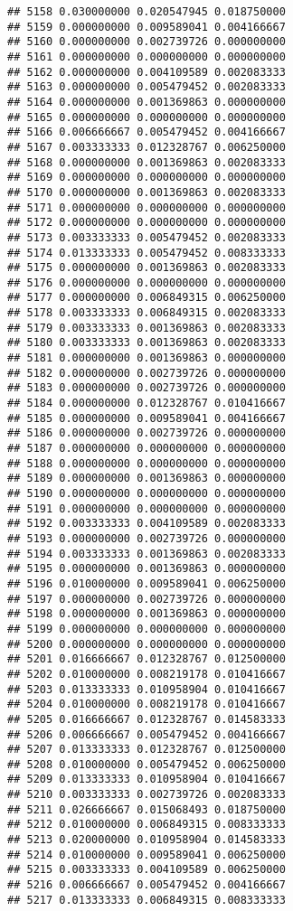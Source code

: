 \documentclass[
]{article}
\begin{document}
\begin{verbatim}
## 5158 0.030000000 0.020547945 0.018750000
## 5159 0.000000000 0.009589041 0.004166667
## 5160 0.000000000 0.002739726 0.000000000
## 5161 0.000000000 0.000000000 0.000000000
## 5162 0.000000000 0.004109589 0.002083333
## 5163 0.000000000 0.005479452 0.002083333
## 5164 0.000000000 0.001369863 0.000000000
## 5165 0.000000000 0.000000000 0.000000000
## 5166 0.006666667 0.005479452 0.004166667
## 5167 0.003333333 0.012328767 0.006250000
## 5168 0.000000000 0.001369863 0.002083333
## 5169 0.000000000 0.000000000 0.000000000
## 5170 0.000000000 0.001369863 0.002083333
## 5171 0.000000000 0.000000000 0.000000000
## 5172 0.000000000 0.000000000 0.000000000
## 5173 0.003333333 0.005479452 0.002083333
## 5174 0.013333333 0.005479452 0.008333333
## 5175 0.000000000 0.001369863 0.002083333
## 5176 0.000000000 0.000000000 0.000000000
## 5177 0.000000000 0.006849315 0.006250000
## 5178 0.003333333 0.006849315 0.002083333
## 5179 0.003333333 0.001369863 0.002083333
## 5180 0.003333333 0.001369863 0.002083333
## 5181 0.000000000 0.001369863 0.000000000
## 5182 0.000000000 0.002739726 0.000000000
## 5183 0.000000000 0.002739726 0.000000000
## 5184 0.000000000 0.012328767 0.010416667
## 5185 0.000000000 0.009589041 0.004166667
## 5186 0.000000000 0.002739726 0.000000000
## 5187 0.000000000 0.000000000 0.000000000
## 5188 0.000000000 0.000000000 0.000000000
## 5189 0.000000000 0.001369863 0.000000000
## 5190 0.000000000 0.000000000 0.000000000
## 5191 0.000000000 0.000000000 0.000000000
## 5192 0.003333333 0.004109589 0.002083333
## 5193 0.000000000 0.002739726 0.000000000
## 5194 0.003333333 0.001369863 0.002083333
## 5195 0.000000000 0.001369863 0.000000000
## 5196 0.010000000 0.009589041 0.006250000
## 5197 0.000000000 0.002739726 0.000000000
## 5198 0.000000000 0.001369863 0.000000000
## 5199 0.000000000 0.000000000 0.000000000
## 5200 0.000000000 0.000000000 0.000000000
## 5201 0.016666667 0.012328767 0.012500000
## 5202 0.010000000 0.008219178 0.010416667
## 5203 0.013333333 0.010958904 0.010416667
## 5204 0.010000000 0.008219178 0.010416667
## 5205 0.016666667 0.012328767 0.014583333
## 5206 0.006666667 0.005479452 0.004166667
## 5207 0.013333333 0.012328767 0.012500000
## 5208 0.010000000 0.005479452 0.006250000
## 5209 0.013333333 0.010958904 0.010416667
## 5210 0.003333333 0.002739726 0.002083333
## 5211 0.026666667 0.015068493 0.018750000
## 5212 0.010000000 0.006849315 0.008333333
## 5213 0.020000000 0.010958904 0.014583333
## 5214 0.010000000 0.009589041 0.006250000
## 5215 0.003333333 0.004109589 0.006250000
## 5216 0.006666667 0.005479452 0.004166667
## 5217 0.013333333 0.006849315 0.008333333

\end{verbatim}
\end{document}
